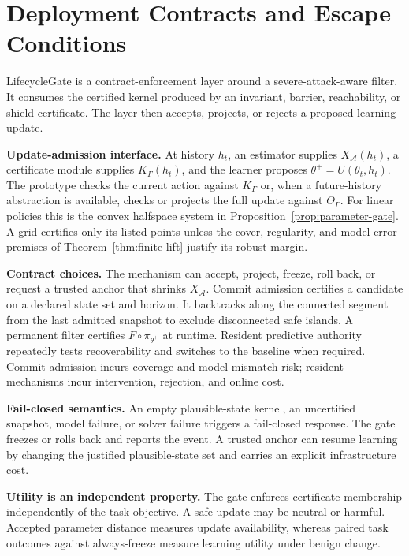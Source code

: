 \section{Deployment Contracts and Escape Conditions}
\label{sec:lifecyclegate}

LifecycleGate is a contract-enforcement layer around a severe-attack-aware
filter.  It consumes the certified kernel produced by an invariant, barrier,
reachability, or shield certificate.  The layer then accepts, projects, or
rejects a proposed learning update.

\textbf{Update-admission interface.}
At history $h_t$, an estimator supplies $X_{\mathcal A}(h_t)$, a certificate
module supplies $K_\Gamma(h_t)$, and the learner proposes
$\theta^+=U(\theta_t,h_t)$.  The prototype checks the current action against
$K_\Gamma$ or, when a future-history abstraction is available, checks or
projects the full update against $\Theta_\Gamma$.  For linear policies this is
the convex halfspace system in Proposition~\ref{prop:parameter-gate}.  A grid
certifies only its listed points unless the cover, regularity, and model-error
premises of Theorem~\ref{thm:finite-lift} justify its robust margin.

\textbf{Contract choices.}
The mechanism can accept, project, freeze, roll back, or request a trusted
anchor that shrinks $X_{\mathcal A}$.  Commit admission certifies a candidate
on a declared state set and horizon.  It backtracks along the connected segment
from the last admitted snapshot to exclude disconnected safe islands.  A
permanent filter certifies $F\circ\pi_{\theta^+}$ at runtime.  Resident
predictive authority repeatedly tests recoverability and switches to the
baseline when required.  Commit admission incurs coverage and model-mismatch
risk; resident mechanisms incur intervention, rejection, and online cost.

\textbf{Fail-closed semantics.}
An empty plausible-state kernel, an uncertified snapshot, model failure, or
solver failure triggers a fail-closed response.  The gate freezes or rolls
back and reports the event.  A trusted anchor can resume learning by changing
the justified plausible-state set and carries an explicit infrastructure cost.

\textbf{Utility is an independent property.}
The gate enforces certificate membership independently of the task objective.
A safe update may be neutral or harmful.  Accepted parameter distance measures
update availability, whereas paired task outcomes against always-freeze measure
learning utility under benign change.
